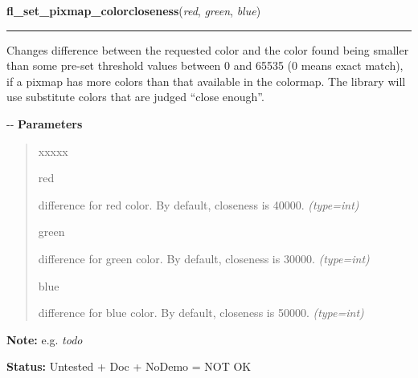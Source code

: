 \hspace{.8\funcindent}\begin{boxedminipage}{\funcwidth}

    \raggedright \textbf{fl\_set\_pixmap\_colorcloseness}(\textit{red}, \textit{green}, \textit{blue})

    \vspace{-1.5ex}

    \rule{\textwidth}{0.5\fboxrule}
\setlength{\parskip}{2ex}

Changes difference between the requested color and the color found
being smaller than some pre-set threshold values between 0 and 65535 (0
means exact match), if a pixmap has more colors than that available in
the colormap. The library will use substitute colors that are judged
``close enough''.

-{}-
\setlength{\parskip}{1ex}
      \textbf{Parameters}
      \vspace{-1ex}

      \begin{quote}
        \begin{Ventry}{xxxxx}

          \item[red]


difference for red color. By default, closeness is 40000.
            {\it (type=int)}

          \item[green]


difference for green color. By default, closeness is 30000.
            {\it (type=int)}

          \item[blue]


difference for blue color. By default, closeness is 50000.
            {\it (type=int)}

        \end{Ventry}

      \end{quote}

\textbf{Note:} 
e.g. \emph{todo}


\textbf{Status:} 
Untested + Doc + NoDemo = NOT OK


    \end{boxedminipage}

    \label{xformslib:flbitmap:fl_free_pixmap_pixmap}

